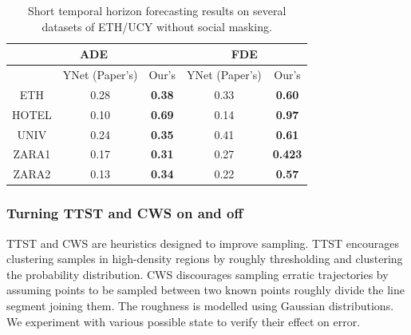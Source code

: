 \begin{table}[H]
\vspace*{-.1in}
\begin{center}
\begin{tabular}{ |c|c|c|c|c| }
 \hline
 \multicolumn{3}{|c|}{ADE} & \multicolumn{2}{|c|}{FDE}  
 \\
 \hline
  & YNet (Paper's) & Our's & YNet (Paper's) & Our's   \\ 
  \hline
  ETH & 0.28 & \textbf{0.38} & 0.33 & \textbf{0.60} \\ 
 \hline
 HOTEL & 0.10 & \textbf{0.69} & 0.14 & \textbf{0.97} \\ 
 \hline
 UNIV & 0.24 & \textbf{0.35} & 0.41 & \textbf{0.61} \\ 
 \hline
 ZARA1 & 0.17 & \textbf{0.31} & 0.27 & \textbf{0.423}\\ 
 \hline
 ZARA2 & 0.13 & \textbf{0.34} & 0.22 & \textbf{0.57}\\ 
 \hline

\end{tabular}
\bigskip
\caption{Short temporal horizon forecasting results on several datasets of ETH/UCY without social masking.}
\label{eq:result_1}
\end{center}
\vspace*{-.1in}
\end{table}



\subsubsection{Turning TTST and CWS on and off}
TTST and CWS are heuristics designed to improve sampling. TTST encourages clustering samples in high-density regions by roughly thresholding and clustering the probability distribution. CWS discourages sampling erratic trajectories by assuming points to be sampled between two known points roughly divide the line segment joining them. The roughness is modelled using Gaussian distributions. We experiment with various possible state to verify their effect on error.

